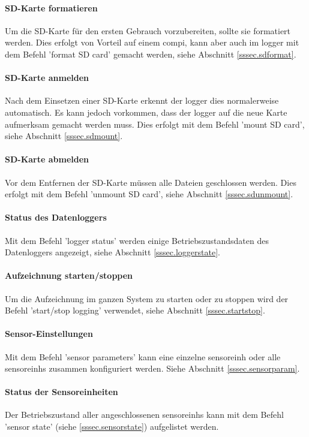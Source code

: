 \paragraph{SD-Karte formatieren} Um die SD-Karte für den ersten Gebrauch vorzubereiten, sollte sie formatiert werden. Dies erfolgt von Vorteil auf einem \gls{compi}, kann aber auch im \gls{logger} mit dem Befehl 'format SD card' gemacht werden, siehe Abschnitt \ref{sssec.sdformat}.

\paragraph{SD-Karte anmelden} Nach dem Einsetzen einer SD-Karte erkennt der \gls{logger} dies normalerweise automatisch. Es kann jedoch vorkommen, dass der \gls{logger} auf die neue Karte aufmerksam gemacht werden muss. Dies erfolgt mit dem Befehl 'mount SD card', siehe Abschnitt \ref{sssec.sdmount}.

\paragraph{SD-Karte abmelden} Vor dem Entfernen der SD-Karte müssen alle Dateien geschlossen werden. Dies erfolgt mit dem Befehl 'unmount SD card', siehe Abschnitt \ref{sssec.sdunmount}.

\paragraph{Status des Datenloggers} Mit dem Befehl 'logger status' werden einige Betriebszustandsdaten des Datenloggers angezeigt, siehe Abschnitt \ref{sssec.loggerstate}.

\paragraph{Aufzeichnung starten/stoppen} Um die Aufzeichnung im ganzen System zu starten oder zu stoppen wird der Befehl 'start/stop logging' verwendet, siehe Abschnitt \ref{sssec.startstop}.

\paragraph{Sensor-Einstellungen} Mit dem Befehl 'sensor parameters' kann eine einzelne \gls{sensoreinh} oder alle \glspl{sensoreinh} zusammen konfiguriert werden. Siehe Abschnitt \ref{sssec.sensorparam}.

\paragraph{Status der Sensoreinheiten} Der Betriebszustand aller angeschlossenen \glspl{sensoreinh} kann mit dem Befehl 'sensor state' (siehe \ref{sssec.sensorstate}) aufgelistet werden.


